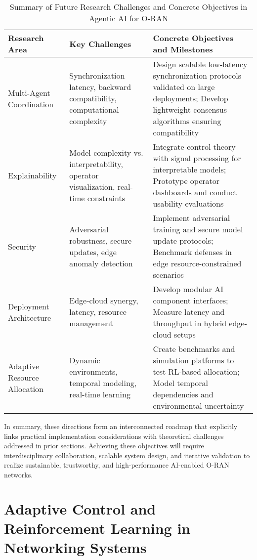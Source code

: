 \documentclass[sigconf]{acmart}
\begin{document}
\begin{table*}[htbp]
\centering
\caption{Summary of Future Research Challenges and Concrete Objectives in Agentic AI for O-RAN}
\label{tab:future_challenges}
\begin{adjustbox}{max width=\textwidth}
\begin{tabular}{@{}lll@{}}
\toprule
\textbf{Research Area} & \textbf{Key Challenges} & \textbf{Concrete Objectives and Milestones} \\
\midrule
Multi-Agent Coordination & Synchronization latency, backward compatibility, computational complexity & Design scalable low-latency synchronization protocols validated on large deployments; Develop lightweight consensus algorithms ensuring compatibility~\cite{ref21} \\
Explainability & Model complexity vs. interpretability, operator visualization, real-time constraints & Integrate control theory with signal processing for interpretable models; Prototype operator dashboards and conduct usability evaluations~\cite{ref48} \\
Security & Adversarial robustness, secure updates, edge anomaly detection & Implement adversarial training and secure model update protocols; Benchmark defenses in edge resource-constrained scenarios~\cite{ref50} \\
Deployment Architecture & Edge-cloud synergy, latency, resource management & Develop modular AI component interfaces; Measure latency and throughput in hybrid edge-cloud setups~\cite{ref50} \\
Adaptive Resource Allocation & Dynamic environments, temporal modeling, real-time learning & Create benchmarks and simulation platforms to test RL-based allocation; Model temporal dependencies and environmental uncertainty~\cite{ref21} \\
\bottomrule
\end{tabular}
\end{adjustbox}
\end{table*}

In summary, these directions form an interconnected roadmap that explicitly links practical implementation considerations with theoretical challenges addressed in prior sections. Achieving these objectives will require interdisciplinary collaboration, scalable system design, and iterative validation to realize sustainable, trustworthy, and high-performance AI-enabled O-RAN networks.

\section{Adaptive Control and Reinforcement Learning in Networking Systems}
\end{document}
